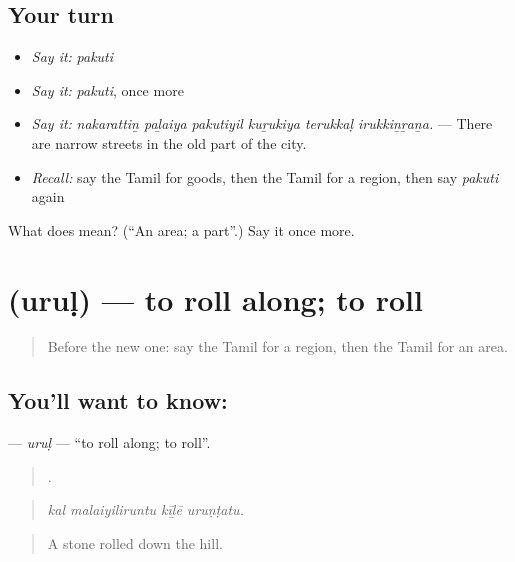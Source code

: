 \subsection*{Your turn}
\begin{itemize}
\raggedright
  \item \emph{Say it:} \emph{pakuti}
  \item \emph{Say it:} \emph{pakuti}, once more
  \item \emph{Say it:} \emph{nakarattiṉ paḻaiya pakutiyil kuṟukiya terukkaḷ irukkiṉṟaṉa.} — There are narrow streets in the old part of the city.
  \item \emph{Recall:} say the Tamil for goods, then the Tamil for a region, then say \emph{pakuti} again
\end{itemize}

\begin{tcolorbox}[breakable,colback=teal!4,colframe=teal!35!black,title={Before you move on}]
What does  mean? (\textquotedblleft{}An area; a part\textquotedblright{}.) Say it once more.
\end{tcolorbox}
\section[\texorpdfstring{\ta{உருள்} (uruḷ)}{உருள் (uruḷ)}]{ (uruḷ) — to roll along; to roll}

\label{lesson:TA-C452-urul}



\begin{quote}
Before the new one: say the Tamil for a region, then the Tamil for an area.
\end{quote}

\subsection*{You'll want to know: }
\textbf{} — \emph{uruḷ} — \textquotedblleft{}to roll along; to roll\textquotedblright{}.

\begin{quote}
   .
\end{quote}

\begin{quote}
\emph{kal malaiyiliruntu kīḻē uruṇṭatu.}
\end{quote}

\begin{quote}
A stone rolled down the hill.
\end{quote}

